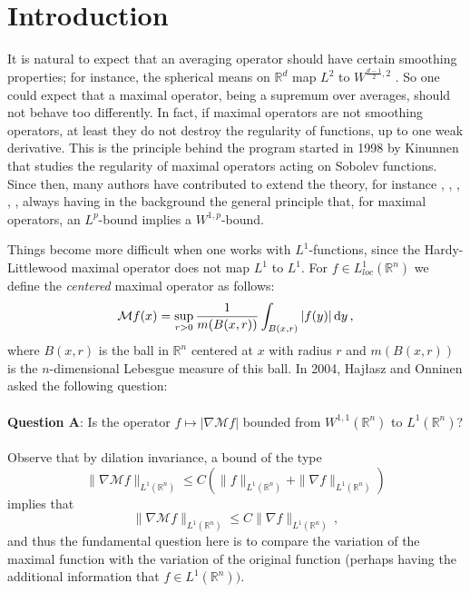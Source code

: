 \documentclass[reqno]{amsart}
\theoremstyle{definition}
\theoremstyle{remark}
\numberwithin{equation}{section}
\newcommand{\R}{\mathbb{R}}
\newcommand{\dy}{\text{\rm d}y}
\begin{document}
\section{Introduction}

It is natural to expect that an averaging operator should have certain smoothing properties; for instance, the spherical means on $\R^d$ map $L^2$ to $W^{\frac{d-1}{2},2}$ \cite[ Chapter 8, \S5.21]{SteinHA}. So one could expect that a maximal operator, being a supremum over averages, should not behave too differently. In fact, if maximal operators are not smoothing operators, at least they do not destroy the regularity of functions, up to one weak derivative. This is the principle behind the program started in 1998 by Kinunnen \cite {Ki} that studies the regularity of maximal operators acting on Sobolev functions. Since then, many authors have contributed to extend the theory, for instance \cite{CM},  \cite{HM}, \cite{KL}, \cite{KiSa}, \cite{Lu1}, always having in the background the general principle that, for maximal operators, an $L^p$-bound implies a $W^{1,p}$-bound.

Things become more difficult when one works with $L^1$-functions, since the Hardy-Littlewood maximal operator does not map $L^1$ to $L^1$. For $f \in L^1_{loc}(\R^n)$ we define the {\it centered} maximal operator as follows:
\begin{equation*}
\mathcal{M}f(x) = \sup_{r>0}\frac{1}{m(B(x,r))} \int_{B(x,r)} |f(y)|\, \dy \,,
\end{equation*}
where $B(x,r)$ is the ball in $\R^n$ centered at $x$ with radius $r$ and $m(B(x,r))$ is the $n$-dimensional Lebesgue measure of this ball. In 2004, Haj\l asz and Onninen \cite[Question 1]{HO} asked the following question: \\
\\
{\bf Question A}: Is the operator $f \mapsto |\nabla \mathcal{M} f|$ bounded from $W^{1,1}(\R^n)$ to $L^1(\R^n)$?\\
\\
Observe that by dilation invariance, a bound of the type
\begin{equation*}
\|\nabla \mathcal{M}f\|_{L^1(\R^n)} \leq C \left( \|f\|_{L^1(\R^n)} + \|\nabla f\|_{L^1(\R^n)} \right)
\end{equation*}
implies that 
\begin{equation}\label{Tan1}
\|\nabla \mathcal{M}f\|_{L^1(\R^n)} \leq C \|\nabla f\|_{L^1(\R^n)}\,,
\end{equation}
and thus the fundamental question here is to compare the variation of the maximal function with the variation of the original function (perhaps having the additional information that $f \in L^1(\R^n))$.
\end{document}
